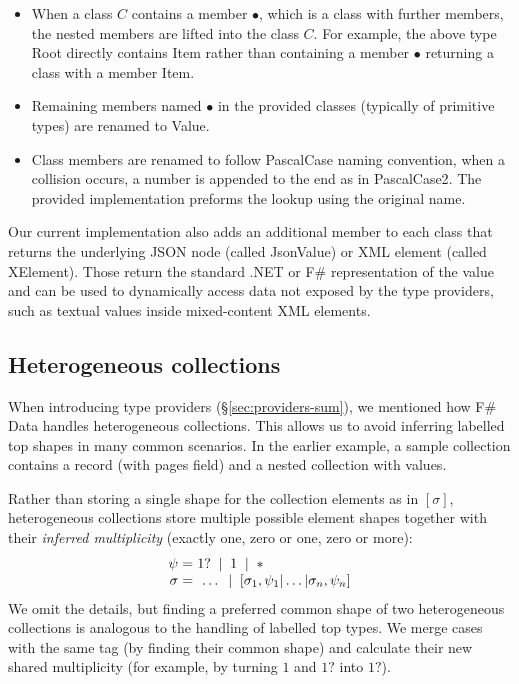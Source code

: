 \documentclass[10pt]{sigplanconf}
\newcommand{\strf}[1]{\textnormal{\textcolor{strclr}{\sffamily #1}}}
\newcommand{\ident}[1]{\textnormal{\sffamily #1}}
\newcommand{\lsep}[0]{\;\; | \;\;}
\newcommand{\narrow}[1]{\hspace{-0.7em} #1 \hspace{-0.7em}}
\begin{document}
\begin{itemize}
\item When a class $C$ contains a member $\bullet$, which is a class with further members, the
  nested members are lifted into the class $C$. For example, the above type \ident{Root}
  directly contains \ident{Item} rather than containing a member $\bullet$ returning a
  class with a member \ident{Item}.

\item Remaining members named $\bullet$ in the provided classes (typically of primitive
  types) are renamed to \ident{Value}.

\item Class members are renamed to follow \ident{PascalCase} naming convention, when a
  collision occurs, a number is appended to the end as in \ident{PascalCase2}. The provided
  implementation preforms the lookup using the original name.
\end{itemize}

Our current implementation also adds an additional member to each class that returns the
underlying JSON node (called \ident{JsonValue}) or XML element (called \ident{XElement}).
Those return the standard .NET or F\# representation of the value and can be used to dynamically
access data not exposed by the type providers, such as textual values inside mixed-content XML elements.


\subsection{Heterogeneous collections}
\label{sec:impl-hetero}

When introducing type providers (\S\ref{sec:providers-sum}), we mentioned how F\# Data
handles heterogeneous collections. This allows us to avoid inferring
labelled top shapes in many common scenarios. In the earlier example, a sample collection
contains a record (with \strf{pages} field) and a nested collection with values.

Rather than storing a single shape for the collection elements as in $[\sigma]$, heterogeneous
collections store multiple possible element shapes together with their \emph{  inferred multiplicity}
(exactly one, zero or one, zero or more):
%
\begin{equation*}
\begin{array}{rcl}
 \psi &\narrow{=}& 1? \lsep 1 \lsep \ast \\
 \sigma &\narrow{=}& ~\ldots \lsep [\sigma_1, \psi_1 | \ldots | \sigma_n, \psi_n ]
\end{array}
\end{equation*}
%
We omit the details, but finding a preferred common shape of two heterogeneous
collections is analogous to the handling of labelled top types. We merge cases with the same tag (by finding
their common shape) and calculate their new shared multiplicity (for example, by turning
$1$ and $1?$ into $1?$).
\end{document}
